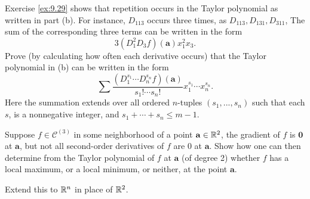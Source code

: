 \begin{myexercise}
\begin{asparaenum}[(a)]
        \item Exercise \ref{ex:9.29} shows that repetition occurs in the Taylor polynomial as written in part (b). 
        For instance, $D_{113}$ occurs three times, as $D_{113}, D_{131}, D_{311}$, 
        The sum of the corresponding three terms can be written in the form
        \begin{equation*}
            3\left( D_1^2 D_3 f \right)(\mathbf{a}) x_1^2 x_3 .
        \end{equation*}
        Prove (by calculating how often each derivative occurs) that the Taylor polynomial in (b) can be written in the form
        \begin{equation*}
            \sum \frac{(D_1^{s_1} \cdots D_n^{s_n} f)(\mathbf{a})}{s_1 ! \cdots s_n !} 
            x_1^{s_1} \cdots x_n^{s_n} .
        \end{equation*}
        Here the summation extends over all ordered $n$-tuples $(s_1, ... , s_n)$ such that each $s$, is a nonnegative integer, and $s_1 + \cdots + s_n \leq m - 1$.
    \end{asparaenum}
\end{myexercise}


\begin{myexercise}
    \label{ex:9.31}
    Suppose $f \in \mathscr{C}^{(3)}$ in some neighborhood of a point $\mathbf{a} \in {\protect\mathbb R}^2$, the gradient of $f$ is $\mathbf{0}$ at $\mathbf{a}$, but not all second-order derivatives of $f$ are 0 at $\mathbf{a}$. 
    Show how one can then determine from the Taylor polynomial of $f$ at $\mathbf{a}$ (of degree 2) whether $f$ has a local maximum, or a local minimum, or neither, at the point $\mathbf{a}$. 
    
    Extend this to ${\protect\mathbb R}^n$ in place of ${\protect\mathbb R}^2$.
\end{myexercise}